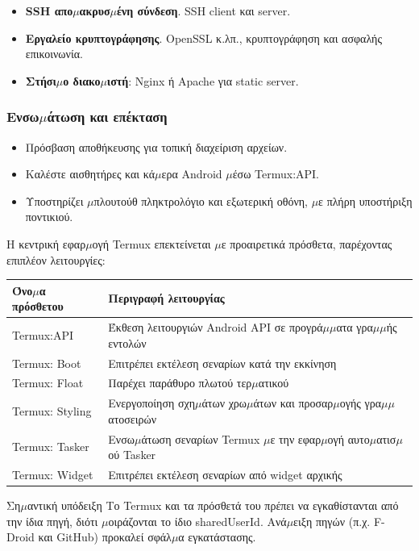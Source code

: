 \begin{itemize}
  \item \textbf{SSH απο$\mu$ακρυσ$\mu$ένη σύνδεση}. SSH client και server.
  \item \textbf{Εργαλείο κρυπτογράφησης}. OpenSSL κ.λπ., κρυπτογράφηση και ασφαλής επικοινωνία.
  \item \textbf{Στήσι$\mu$ο διακο$\mu$ιστή}: Nginx ή Apache για static server.
\end{itemize}

\subsubsection*{Ενσω$\mu$άτωση και επέκταση}

\begin{itemize}
  \item Πρόσβαση αποθήκευσης για τοπική διαχείριση αρχείων.
  \item Καλέστε αισθητήρες και κά$\mu$ερα Android $\mu$έσω Termux:API.
  \item Υποστηρίζει $\mu$πλουτούθ πληκτρολόγιο και εξωτερική οθόνη, $\mu$ε πλήρη υποστήριξη ποντικιού.
\end{itemize}


Η κεντρική εφαρ$\mu$ογή Termux επεκτείνεται $\mu$ε προαιρετικά πρόσθετα, παρέχοντας επιπλέον λειτουργίες:

\begin{center}
\begin{tabularx}{\linewidth}{|X|X|}
\hline
\textbf{Όνο$\mu$α πρόσθετου} & \textbf{Περιγραφή λειτουργίας} \tabularnewline
\hline
Termux:API & Έκθεση λειτουργιών Android API σε προγρά$\mu$$\mu$ατα γρα$\mu$$\mu$ής εντολών \tabularnewline
Termux: Boot & Επιτρέπει εκτέλεση σεναρίων κατά την εκκίνηση \tabularnewline
Termux: Float & Παρέχει παράθυρο πλωτού τερ$\mu$ατικού \tabularnewline
Termux: Styling & Ενεργοποίηση σχη$\mu$άτων χρω$\mu$άτων και προσαρ$\mu$ογής γρα$\mu$$\mu$ατοσειρών \tabularnewline
Termux: Tasker & Ενσω$\mu$άτωση σεναρίων Termux $\mu$ε την εφαρ$\mu$ογή αυτο$\mu$ατισ$\mu$ού Tasker \tabularnewline
Termux: Widget & Επιτρέπει εκτέλεση σεναρίων από widget αρχικής \tabularnewline
\hline
\end{tabularx}
\end{center}

\begin{tcbwarn}{Ση$\mu$αντική υπόδειξη}
Το Termux και τα πρόσθετά του πρέπει να εγκαθίστανται από την ίδια πηγή, διότι $\mu$οιράζονται το ίδιο sharedUserId. Ανά$\mu$ειξη πηγών (π.χ. F-Droid και GitHub) προκαλεί σφάλ$\mu$α εγκατάστασης.

\end{tcbwarn}

